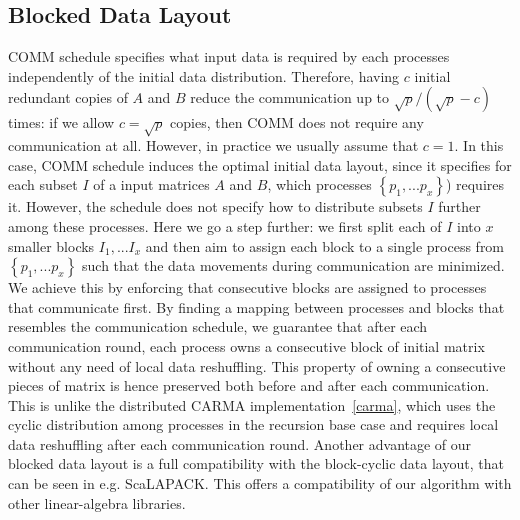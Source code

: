 \documentclass[sigplan,review,anonymous,10pt]{acmart}\settopmatter{printfolios=true,printccs=false,printacmref=false}
\begin{document}
\subsection{Blocked Data Layout}
\label{sec:datalayout}
COMM schedule specifies what input data is required by each processes
independently of the initial data distribution. 
Therefore, having $c$ initial redundant copies of $A$ and $B$ reduce the 
communication up to $\sqrt{p}/(\sqrt{p} - c)$ times: if we allow $c = \sqrt{p}$ 
copies, then COMM does not require any communication at all. However, in 
practice we usually 
assume that $c=1$. In this 
case, COMM schedule induces the optimal initial data 
layout, since it specifies for each subset $I$ of a input matrices $A$ and $B$, 
which 
processes $\left\{ p_1, ... p_x\right\}$) requires it. 
However, the schedule does not specify how to distribute subsets $I$ further 
among these processes. Here we go a step further: we first split each of $I$ 
into $x$ smaller blocks $I_1, ... I_x$ and then aim to assign each 
block to a single process from $\left\{ p_1, ... p_x\right\}$ such that the 
data movements during communication are minimized. We achieve this by enforcing 
that consecutive blocks are assigned to processes that communicate first. By 
finding a mapping between processes and blocks that resembles the 
communication schedule, we guarantee that after each communication round, each 
process owns a consecutive block of initial matrix without any need of local 
data reshuffling. This property of owning a consecutive pieces of matrix is 
hence preserved both before and after each communication. This is unlike the 
distributed CARMA implementation~\ref{carma}, which uses the cyclic 
distribution among processes in the recursion base case and requires local data 
reshuffling after each communication round. Another advantage of our blocked 
data layout is a full compatibility with the block-cyclic data 
layout, that can be seen in e.g. ScaLAPACK. This offers a compatibility 
of our algorithm with other linear-algebra libraries.
\end{document}
